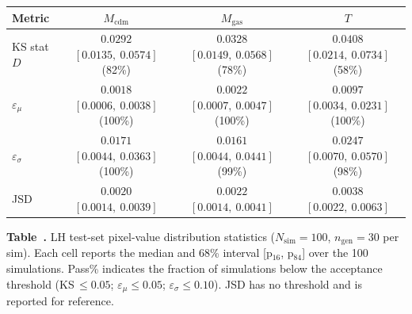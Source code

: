 \begingroup
  \centering
  \small
  \setlength{\tabcolsep}{4pt}
  \renewcommand{\arraystretch}{1.08}
  \label{tab:lh_pdf}
  \begin{tabular*}{\textwidth}{@{\extracolsep{\fill}}lccc@{}}
    \toprule
    Metric & $M_{\mathrm{cdm}}$ & $M_{\mathrm{gas}}$ & $T$ \\
    \midrule
    KS stat $D$ & $0.0292$ $[0.0135,\ 0.0574]$ (82\%) & $0.0328$ $[0.0149,\ 0.0568]$ (78\%) & $0.0408$ $[0.0214,\ 0.0734]$ (58\%) \\
    $\varepsilon_\mu$ & $0.0018$ $[0.0006,\ 0.0038]$ (100\%) & $0.0022$ $[0.0007,\ 0.0047]$ (100\%) & $0.0097$ $[0.0034,\ 0.0231]$ (100\%) \\
    $\varepsilon_\sigma$ & $0.0171$ $[0.0044,\ 0.0363]$ (100\%) & $0.0161$ $[0.0044,\ 0.0441]$ (99\%) & $0.0247$ $[0.0070,\ 0.0570]$ (98\%) \\
    JSD & $0.0020$ $[0.0014,\ 0.0039]$ & $0.0022$ $[0.0014,\ 0.0041]$ & $0.0038$ $[0.0022,\ 0.0063]$ \\
    \bottomrule
  \end{tabular*}
  \par\smallskip
  \parbox{\textwidth}{\small
    \textbf{Table~\thetable.} LH test-set pixel-value distribution statistics
    ($N_{\mathrm{sim}}=100$, $n_{\mathrm{gen}}=30$ per sim). Each cell reports
    the median and 68\% interval [p$_{16}$, p$_{84}$] over the 100 simulations.
    Pass\% indicates the fraction of simulations below the acceptance threshold
    (KS\,$\leq\!0.05$; $\varepsilon_\mu\!\leq\!0.05$;
    $\varepsilon_\sigma\!\leq\!0.10$). JSD has no threshold and is reported for
    reference.}
  \par\vspace{1em}
\endgroup
